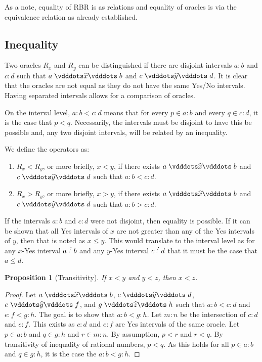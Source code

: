 \documentclass[12pt]{article}
\newtheorem{proposition}{Proposition}[section]
\begin{document}
As a note, equality of RBR is as relations and equality of oracles is via the equivalence relation as already established. 

\subsection{Inequality}

Two oracles $R_x$ and $R_y$ can be distinguished if there are disjoint intervals $a:b$ and $c:d$ such that $a \xora b$ and $c \xora[y] d$. It is clear that the oracles are not equal as they do not have the same Yes/No intervals. Having separated intervals allows for a comparison of oracles. 

On the interval level, $a:b < c:d$ means that for every $p \in a:b$ and every $q \in c:d$, it is the case that $p < q$. Necessarily, the intervals must be disjoint to have this be possible and, any two disjoint intervals, will be related by an inequality. 

We define the operators as:
\begin{enumerate}
    \item $R_x < R_y$, or more briefly, $x < y$, if there exists $a \xora b$ and $c \xora[y] d$ such that $a:b<c:d$.
    \item $R_x > R_y$, or more briefly, $x > y$, if there exists $a \xora b$ and $c \xora[y] d$ such that $a:b > c:d$.
\end{enumerate}

If the intervals $a:b$ and $c:d$ were not disjoint, then equality is possible. If it can be shown that all Yes intervals of $x$ are not greater than any of the Yes intervals of $y$, then that is noted as $x \leq y$. This would translate to the interval level as for any $x$-Yes interval $a \lte b$ and any $y$-Yes interval $c \lte d$ that it must be the case that $a \leq d$. 

\begin{proposition}[Transitivity]
    If $x <y$ and $y<z$, then $x < z$.
\end{proposition}

\begin{proof}
    Let $a \xora b$, $c \xora[y] d$, $e \xora[y] f$, and $g \xora[z] h$ such that $a:b < c:d$ and $e:f < g:h$. The goal is to show that $a:b < g:h$. Let $m:n$ be the intersection of $c:d$ and $e:f$. This exists as $c:d$ and $e:f$ are Yes intervals of the same oracle. Let $p \in a:b$ and $q \in g:h$ and $r \in m:n$. By assumption, $p < r$ and $r < q$. By transitivity of inequality of rational numbers, $p < q$. As this holds for all $p \in a:b$ and $q \in g:h$, it is the case the $a:b <g:h$.
\end{proof}
\end{document}
